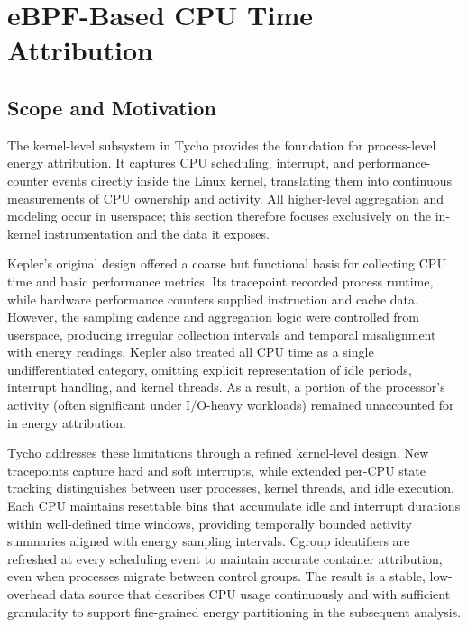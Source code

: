 \section{eBPF-Based CPU Time Attribution}
\label{sec:ebpf-architecture}

\subsection{Scope and Motivation}
\label{subsec:ebpf-scope-motivation}

The kernel-level  subsystem in Tycho provides the foundation for process-level energy attribution.  
It captures CPU scheduling, interrupt, and performance-counter events directly inside the Linux kernel, translating them into continuous measurements of CPU ownership and activity.  
All higher-level aggregation and modeling occur in userspace; this section therefore focuses exclusively on the in-kernel instrumentation and the data it exposes.

Kepler’s original  design offered a coarse but functional basis for collecting CPU time and basic performance metrics.  
Its  tracepoint recorded process runtime, while hardware performance counters supplied instruction and cache data.  
However, the sampling cadence and aggregation logic were controlled from userspace, producing irregular collection intervals and temporal misalignment with energy readings.  
Kepler also treated all CPU time as a single undifferentiated category, omitting explicit representation of idle periods, interrupt handling, and kernel threads.  
As a result, a portion of the processor’s activity (often significant under I/O-heavy workloads) remained unaccounted for in energy attribution.

Tycho addresses these limitations through a refined kernel-level design.  
New tracepoints capture hard and soft interrupts, while extended per-CPU state tracking distinguishes between user processes, kernel threads, and idle execution.  
Each CPU maintains resettable bins that accumulate idle and interrupt durations within well-defined time windows, providing temporally bounded activity summaries aligned with energy sampling intervals.  
Cgroup identifiers are refreshed at every scheduling event to maintain accurate container attribution, even when processes migrate between control groups.  
The result is a stable, low-overhead data source that describes CPU usage continuously and with sufficient granularity to support fine-grained energy partitioning in the subsequent analysis.

